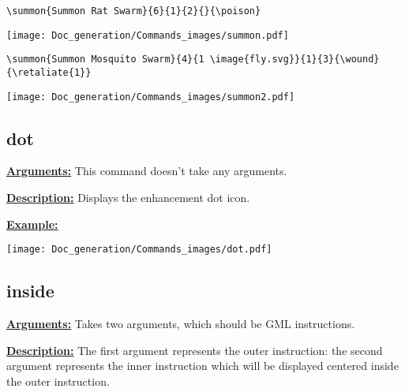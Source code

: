 \documentclass{article}
\begin{document}
\begin{center}
\begin{BVerbatim}
\summon{Summon Rat Swarm}{6}{1}{2}{}{\poison}
\end{BVerbatim}
\end{center}

\begin{center}
\texttt{[image: Doc\_generation/Commands\_images/summon.pdf]}
\end{center}

\begin{center}
\begin{BVerbatim}
\summon{Summon Mosquito Swarm}{4}{1 \image{fly.svg}}{1}{3}{\wound}{\retaliate{1}}
\end{BVerbatim}
\end{center}

\begin{center}
\texttt{[image: Doc\_generation/Commands\_images/summon2.pdf]}
\end{center}

\subsection{dot}
\textbf{\underline{Arguments:}} This command doesn't take any arguments.

\textbf{\underline{Description:}} Displays the enhancement dot icon.

\textbf{\underline{Example:}}

\begin{minipage}{0.45\linewidth}
\raggedright
\begin{spverbatim}
 \dot \dot

\end{spverbatim}
\end{minipage}
\begin{minipage}{0.45\linewidth}
\raggedleft
\texttt{[image: Doc\_generation/Commands\_images/dot.pdf]}
\end{minipage} 

\subsection{inside}
\textbf{\underline{Arguments:}} Takes two arguments, which should be GML instructions.

\textbf{\underline{Description:}} The first argument represents the outer instruction: the second argument represents the inner instruction which will be displayed centered inside the outer instruction.
\end{document}
